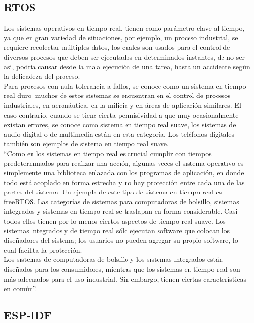 \subsection{RTOS}

Los sistemas operativos en tiempo real, tienen como parámetro clave al tiempo, ya que en gran variedad de situaciones, por ejemplo, un proceso industrial, se requiere recolectar múltiples datos, los cuales son usados para el control de diversos procesos que deben ser ejecutados en determinados instantes, de no ser así, podría causar desde la mala ejecución de una tarea, hasta un accidente según la delicadeza del proceso.\\ 

Para procesos con nula tolerancia a fallos, se conoce como un sistema en tiempo real duro, muchos de estos sistemas se encuentran en el control de procesos industriales, en aeronáutica, en la milicia y en áreas de aplicación similares. El caso contrario, cuando se tiene cierta permisividad a que muy ocasionalmente existan errores, se conoce como sistema en tiempo real suave, los sistemas de audio digital o de multimedia están en esta categoría. Los teléfonos digitales también son ejemplos de sistema en tiempo real suave. \cite{SO} \\

``Como en los sistemas en tiempo real es crucial cumplir con tiempos predeterminados para realizar una acción, algunas veces el sistema operativo es simplemente una biblioteca enlazada con los programas de aplicación, en donde todo está acoplado en forma estrecha y no hay protección entre cada una de las partes del sistema. Un ejemplo de este tipo de sistema en tiempo real es freeRTOS.  Las categorías de sistemas para computadoras de bolsillo, sistemas integrados y sistemas en tiempo real se traslapan en forma considerable. Casi todos ellos tienen por lo menos ciertos aspectos de tiempo real suave. Los sistemas integrados y de tiempo real sólo ejecutan software que colocan los diseñadores del sistema; los usuarios no pueden agregar su propio software, lo cual facilita la protección. \\

Los sistemas de computadoras de bolsillo y los sistemas integrados están diseñados para los consumidores, mientras que los sistemas en tiempo real son más adecuados para el uso industrial. Sin embargo, tienen ciertas características en común''. \cite{SO}

\subsection{ESP-IDF}

